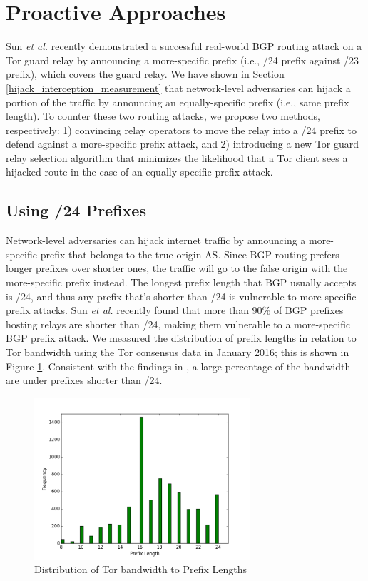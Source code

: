 \section{Proactive Approaches}
\label{sec:proactive}
Sun \emph{et al.} \cite{sun2015raptor} recently demonstrated a successful real-world BGP routing attack on a Tor guard relay by announcing a more-specific prefix (i.e., /24 prefix against /23 prefix), which covers the guard relay. We have shown in Section \ref{hijack_interception_measurement} that network-level adversaries can hijack a portion of the traffic by announcing an equally-specific prefix (i.e., same prefix length). To counter these two routing attacks, we propose two methods, respectively: 1) convincing relay operators to move the relay into a /24 prefix to defend against a more-specific prefix attack, and 2) introducing a new Tor guard relay selection algorithm that minimizes the likelihood that a Tor client sees a hijacked route in the case of an equally-specific prefix attack.

\subsection{Using /24 Prefixes}
\label{subsec:24prefix}
Network-level adversaries can hijack internet traffic by announcing a more-specific prefix that belongs to the true origin AS. Since BGP routing prefers longer prefixes over shorter ones, the traffic will go to the false origin with the more-specific prefix instead. The longest prefix length that BGP usually accepts is /24, and thus any prefix that's shorter than /24 is vulnerable to more-specific prefix attacks. 
Sun \emph{et al.} \cite{sun2015raptor} recently found that more than 90\% of BGP prefixes hosting relays are
shorter than /24, making them vulnerable to a more-specific BGP prefix attack. We measured the distribution of prefix lengths in relation to Tor bandwidth using the Tor consensus data in January 2016; this is shown in Figure \ref{fig_prefixlen}. Consistent with the findings in \cite{sun2015raptor}, a large percentage of the bandwidth are under prefixes shorter than /24. 

\begin{figure}[ht!]
\centering
\includegraphics[width=80mm]{prefix_len_graph}
\caption{Distribution of Tor bandwidth to Prefix Lengths  \label{fig_prefixlen}}
\end{figure}

